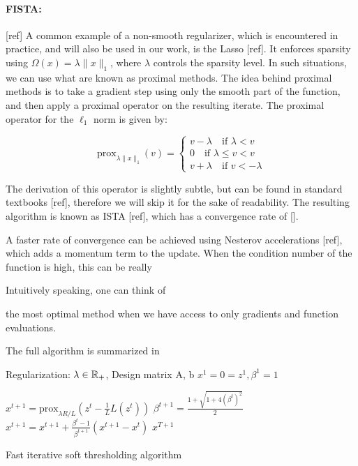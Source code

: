 \paragraph{FISTA: }[ref] A common example of a non-smooth regularizer, which is encountered in practice, and will also be used in our work, is the Lasso [ref]. It enforces sparsity using $\Omega(x) = \lambda \|x\|_1$, where $\lambda$ controls the sparsity level. In such situations, we can use what are known as proximal methods. The idea behind proximal methods is to take a gradient step using only the smooth part of the function, and then apply a proximal operator on the resulting iterate. The proximal operator for the $\ell_1$ norm is given by:

\begin{equation}
\mathrm{prox}_{\lambda \|x\|_1}(v) = \begin{cases}
v - \lambda \quad \text{if } \lambda < v \\
0 \quad \text{if } \lambda \leq v < v\\
v + \lambda \quad \text{if } v < -\lambda
\end{cases}
\end{equation}

The derivation of this operator is slightly subtle, but can be found in standard textbooks [ref], therefore we will skip it for the sake of readability. The resulting algorithm is known as ISTA [ref], which has a convergence rate of [].

A faster rate of convergence can be achieved using Nesterov accelerations [ref], which adds a momentum term to the update. When the condition number of the function is high, this can be really

 Intuitively speaking, one can think of 

the most optimal method when we have access to only gradients and function evaluations.

The full algorithm is summarized in

    \begin{algorithm}[H]
      \begin{algorithmic}[1] %
      \REQUIRE Regularization: $\lambda \in \mathbb{R}_+$, Design matrix A, b
      \STATE $x^1=0=z^1, \beta^1=1$
          
          \STATE $x^{t+1} = \mathrm{prox}_{\lambda R/L}(z^t - \frac{1}{L}L(z^t))$
          \STATE $\beta^{t+1} = \frac{1 + \sqrt{1 + 4(\beta^t)^2}}{2}$
          \STATE $x^{t + 1} = x^{t + 1} + \frac{\beta^t - 1}{\beta^{t + 1}}(x^{t + 1} - x^t)$
        \ENDFOR
        \RETURN $x^{T + 1}$
        \end{algorithmic}
        \caption{Fast iterative soft thresholding algorithm}
        \label{alg:fista}
    \end{algorithm}

